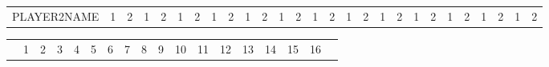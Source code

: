 \begin{table}
\begin{tabular}{r|c|c|c|c|c|c|c|c|c|c|c|c|c|c|c|c|c|c|c|c|c|c|c|c|c|c|}
\cline{1-27}
\cline{1-27}
\footnotesize PLAYER2NAME & \footnotesize 1 & \footnotesize 2 & \footnotesize 1 & \footnotesize 2 & \footnotesize 1 & \footnotesize 2 & \footnotesize 1 & \footnotesize 2 & \footnotesize 1 & \footnotesize 2 & \footnotesize 1 & \footnotesize 2 & \footnotesize 1 & \footnotesize 2 & \footnotesize 1 & \footnotesize 2 & \footnotesize 1 & \footnotesize 2 & \footnotesize 1 & \footnotesize 2 & \footnotesize 1 & \footnotesize 2 & \footnotesize 1 & \footnotesize 2 & \footnotesize 1 & \footnotesize 2 \\
\cline{2-27}
\end{tabular}
\begin{tabular}{p{5cm}|c|c|c|c|c|c!{\vrule width 2pt}c|c|c|c|c|c|c|c|c|c!{\vrule width 3pt}p{1cm}!{\vrule width 3pt}}
& 1 & 2 & 3 & 4 & 5 & 6 & 7 & 8 & 9 & 10 & 11 & 12 & 13 & 14 & 15 & 16 & \\
\end{tabular}
\end{table}

